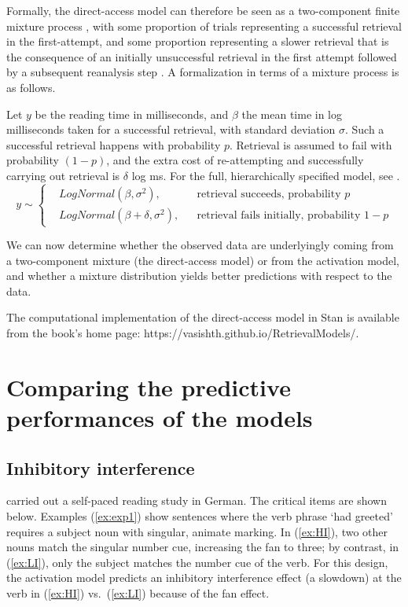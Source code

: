 \documentclass{cambridge7A}\usepackage[]{graphicx}\usepackage[]{color}
\begin{document}
Formally, the direct-access model can therefore be seen as a two-component finite mixture process \citep{mclachlan2004finite,fruhwirth2006finite}, with some proportion of trials representing a successful retrieval in the first-attempt, and some proportion representing a slower retrieval that is the consequence of an initially unsuccessful retrieval in the first attempt followed by a subsequent reanalysis step \citep{NicenboimRetrieval2018}. A formalization in terms of a mixture process is as follows.

Let $y$ be the reading time in milliseconds, and $\beta$ the mean time in log milliseconds taken for a successful retrieval, with standard deviation $\sigma$. Such a successful retrieval happens with probability $p$. Retrieval is assumed to fail with probability $(1-p)$, and the extra cost of re-attempting and successfully carrying out retrieval is $\delta$ log ms. For the full, hierarchically specified model, see \cite{NicenboimRetrieval2018}.
\begin{equation} \label{eq:mixmodsr2}
  y \sim \left \{
  \begin{aligned}
    &LogNormal(\beta,\sigma^2), && \text{retrieval succeeds, probability $p$} \\
    & LogNormal(\beta+\delta,\sigma^2), && \text{retrieval fails initially, probability $1-p$} 
  \end{aligned} \right.
\end{equation} 

We can now determine whether the observed data are underlyingly coming from a two-component mixture (the direct-access model) or from the activation model, and whether a mixture distribution yields better predictions with respect to the data.  

The \cite{NicenboimRetrieval2018} computational implementation of the direct-access model in Stan \citep{stan:2017} is available from the book's home page: https://vasishth.github.io/RetrievalModels/.

\section{Comparing the predictive performances of the models}\label{nicenboiminhint}

\subsection{Inhibitory interference}

\cite{nicenboimexploratory} carried out a self-paced reading study in German. The critical items are shown below. Examples (\ref{ex:exp1}) show  sentences where the verb phrase `had greeted' requires a subject noun with singular, animate marking. In (\ref{ex:HI}), two other nouns match the  singular number cue, increasing the fan to three; by contrast, in (\ref{ex:LI}), only the subject matches the number cue of the verb.  For this design, the activation model predicts an inhibitory interference effect (a slowdown) at the verb in (\ref{ex:HI}) vs.\ (\ref{ex:LI}) because of the fan effect.    
\end{document}
